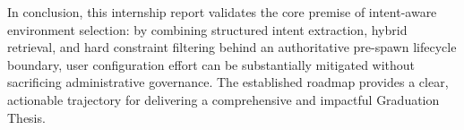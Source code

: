 In conclusion, this internship report validates the core premise of intent-aware environment selection: by combining structured intent extraction, hybrid retrieval, and hard constraint filtering behind an authoritative pre-spawn lifecycle boundary, user configuration effort can be substantially mitigated without sacrificing administrative governance. The established roadmap provides a clear, actionable trajectory for delivering a comprehensive and impactful Graduation Thesis.
